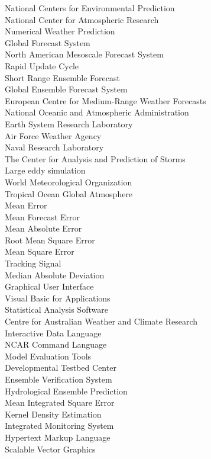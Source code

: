 \begin{figure}[!h]
\begin{minipage}[h]{0.8\textwidth}
		  National Centers for Environmental Prediction \\
		  National Center for Atmospheric Research \\
		  Numerical Weather Prediction \\
		  Global Forecast System \\
		  North American Mesoscale Forecast System \\
		  Rapid Update Cycle \\
		  Short Range Ensemble Forecast \\
		  Global Ensemble Forecast System \\
		  European Centre for Medium-Range Weather Forecasts \\
		  National Oceanic and Atmospheric Administration \\
		  Earth System Research Laboratory \\
		  Air Force Weather Agency \\
		  Naval Research Laboratory \\
		  The Center for Analysis and Prediction of Storms \\
		  Large eddy simulation \\
		  World Meteorological Organization \\
		  Tropical Ocean Global Atmosphere \\
		  Mean Error \\
		  Mean Forecast Error \\
		  Mean Absolute Error \\
		  Root Mean Square Error \\
		  Mean Square Error \\
		  Tracking Signal \\
		  Median Absolute Deviation \\
		  Graphical User Interface \\
		  Visual Basic for Applications \\
		  Statistical Analysis Software \\
		  Centre for Australian Weather and Climate Research \\
		  Interactive Data Language \\
		  NCAR Command Language \\
		  Model Evaluation Tools \\
		  Developmental Testbed Center \\
		  Ensemble Verification System \\
		  Hydrological Ensemble Prediction \\
		  Mean Integrated Square Error \\
		  Kernel Density Estimation \\
		  Integrated Monitoring System \\
		  Hypertext Markup Language \\
		  Scalable Vector Graphics \\
		  \end{minipage}
	\end{figure}
	
